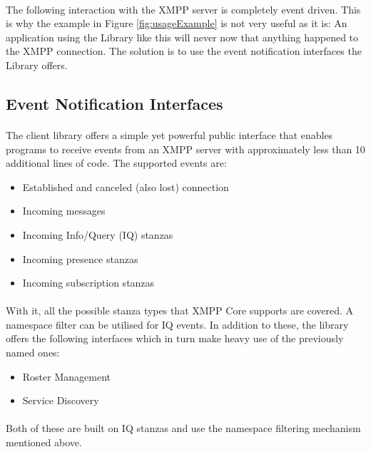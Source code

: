 \paragraph{}
The following interaction with the XMPP server is completely event driven. This is why the example in Figure \ref{fig:usageExample} is not very useful as it is: An application using the Library like this will never now that anything happened to the XMPP connection. The solution is to use the event notification interfaces the Library offers.

\subsection{Event Notification Interfaces}
\label{sec:interfaces}
\paragraph{}
The client library offers a simple yet powerful public interface that enables programs to receive events from an XMPP server with approximately less than 10 additional lines of code. The supported events are:
\begin{itemize}
\item Established and canceled (also lost) connection
\item Incoming messages
\item Incoming Info/Query (IQ) stanzas
\item Incoming presence stanzas
\item Incoming subscription stanzas
\end{itemize}
\paragraph{}
With it, all the possible stanza types that XMPP Core supports are covered. A namespace filter can be utilised for IQ events. In addition to these, the library offers the following interfaces which in turn make heavy use of the previously named ones:
\begin{itemize}
\item Roster Management
\item Service Discovery
\end{itemize}
\paragraph{}
Both of these are built on IQ stanzas and use the namespace filtering mechanism mentioned above.


